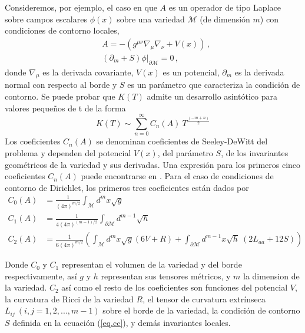 Consideremos, por ejemplo, el caso en que $A$ es un operador de tipo Laplace sobre campos escalares $\phi(x)$ sobre una variedad $\mathcal{M}$ (de dimensión $m$) con condiciones de contorno locales,
\begin{align}\label{eq.cc}
&A = - \left(
			g ^{\mu \nu} \nabla _{\mu} \nabla _{\nu} + V(x)	\right) \,,\\[2mm]
&\left (\partial _m + S \right) \phi | _{\partial \mathcal{M}} = 0\,,
\end{align}
donde $\nabla _{\mu}$ es la derivada covariante, $V(x)$ es un potencial, $\partial _m$ es la derivada normal con respecto al borde y $S$ es un parámetro que caracteriza la condición de contorno. Se puede probar \cite{10.2307/2373309,10.2307/2373078} que $K(T)$ admite un desarrollo asintótico para valores pequeños de t  de la forma
\begin{equation}
K(T) \sim 
\sum _{n=0} ^{\infty}
C _n (A) \ 
T^{\frac{(-m+n)}{2}} 
\label{eq.heat.expansion}
\end{equation}
Los coeficientes $C_n(A)$ se denominan coeficientes de Seeley-DeWitt del problema y dependen del potencial $V(x)$, del parámetro $S$, de los invariantes geométricos de la variedad y sus derivadas. Una expresión para los primeros cinco coeficientes $C _n (A) $ puede encontrarse en \cite{Vassilevich:2003xt}. Para el caso de condiciones de contorno de Dirichlet, los primeros tres coeficientes están dados por
\begin{align}
C _0 (A) &= \frac{1}{(4 \pi ) ^{m/2} }  \int  _{\mathcal{M}} d ^m x \sqrt{g}  \\[2mm]
C _1 (A) &= \frac{ 1 }{4 (4 \pi ) ^{(m-1)/2} } \int _{\partial \mathcal{M} } d ^{m-1} \sqrt{h} \\[2mm]
C _2 (A) &= \frac{ 1 }{6 (4 \pi) ^{m/2} } \left(
									\int _{\mathcal{M}} d ^m x\sqrt{g} (6 V + R) +
									\int _{\partial \mathcal{M} } d ^{m-1} x 
									\sqrt{h} \ ( 2 L _{aa} + 12 S )
									\right)
\label{coef}
\end{align} 

Donde $C _0$ y $C _1$ representan el volumen de la variedad y del borde respectivamente, así $g$ y $h$ representan sus tensores métricos, y $m$ la dimension de la variedad. $C _2$ así como el resto de los coeficientes son funciones del potencial $V$, la curvatura de Ricci de la variedad $R$, el tensor de curvatura extrínseca $L _{ij } \ (i,j = 1,2,...,m-1)$ sobre el borde de la variedad, la condición de contorno $S$ definida en la ecuación (\ref{eq.cc}), y demás invariantes locales.


